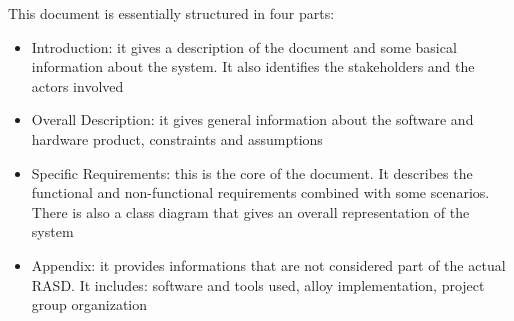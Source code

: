 This document is essentially structured in four parts:
\begin{itemize}
	\item Introduction: it gives a description of the  document and some basical information about the system. It also identifies the stakeholders and the actors involved
	\item Overall Description: it gives general information about the software and hardware product, constraints and assumptions
	\item Specific Requirements: this is the core of the document. It describes the functional and non-functional requirements combined with some scenarios. There is also a class diagram that gives an overall representation of the system
	\item Appendix: it provides informations that are not considered part of the actual RASD. It includes: software and tools used, alloy implementation, project group organization	
\end{itemize}
